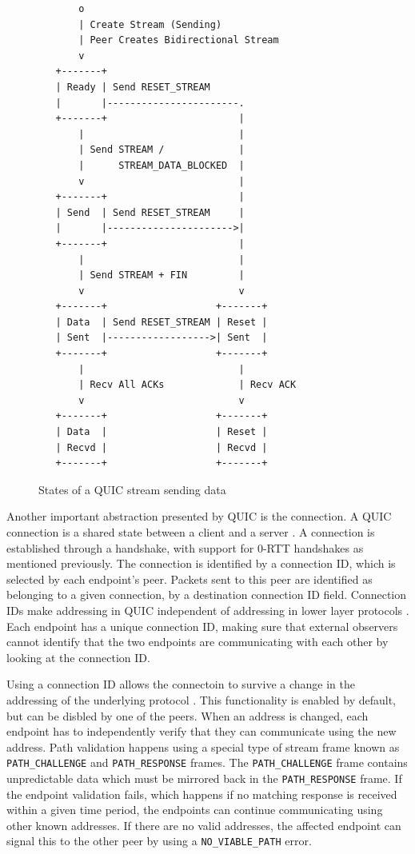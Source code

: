 \begin{figure}[H]
    \centering
    \begin{lstlisting}
       o
       | Create Stream (Sending)
       | Peer Creates Bidirectional Stream
       v
   +-------+
   | Ready | Send RESET_STREAM
   |       |-----------------------.
   +-------+                       |
       |                           |
       | Send STREAM /             |
       |      STREAM_DATA_BLOCKED  |
       v                           |
   +-------+                       |
   | Send  | Send RESET_STREAM     |
   |       |---------------------->|
   +-------+                       |
       |                           |
       | Send STREAM + FIN         |
       v                           v
   +-------+                   +-------+
   | Data  | Send RESET_STREAM | Reset |
   | Sent  |------------------>| Sent  |
   +-------+                   +-------+
       |                           |
       | Recv All ACKs             | Recv ACK
       v                           v
   +-------+                   +-------+
   | Data  |                   | Reset |
   | Recvd |                   | Recvd |
   +-------+                   +-------+
    \end{lstlisting}
    \caption{States of a QUIC stream sending data \cite{iyengarQUICUDPBasedMultiplexed2021}}
    \label{fig:stream_states}
\end{figure}

Another important abstraction presented by QUIC is the connection.
A QUIC connection is a shared state between a client and a server 
\cite{iyengarQUICUDPBasedMultiplexed2021}.
A connection is established through a handshake, with support
for 0-RTT handshakes as mentioned previously. The connection
is identified by a connection ID, which is selected by each
endpoint's peer. Packets sent to this peer are identified as
belonging to a given connection, by a destination connection ID
field. Connection IDs make addressing in QUIC independent of addressing in lower layer
protocols \cite{iyengarQUICUDPBasedMultiplexed2021}. Each endpoint
has a unique connection ID, making sure that external observers cannot
identify that the two endpoints are communicating with each
other by looking at the connection ID.

Using a connection ID allows the connectoin to survive a change
in the addressing of the underlying protocol \cite{iyengarQUICUDPBasedMultiplexed2021}.
This functionality is enabled by default, but can be disbled by
one of the peers. When an address is changed, each endpoint has to
independently verify that they can communicate using the new address.
Path validation happens using a special type of stream frame
known as \texttt{PATH\_CHALLENGE} and \texttt{PATH\_RESPONSE}
frames. The \texttt{PATH\_CHALLENGE} frame contains unpredictable
data which must be mirrored back in the \texttt{PATH\_RESPONSE} frame.
If the endpoint validation fails, which happens if no matching response
is received within a given time period, the endpoints can continue
communicating using other known addresses. If there are no valid
addresses, the affected endpoint can signal this to the other
peer by using a \texttt{NO\_VIABLE\_PATH} error.

